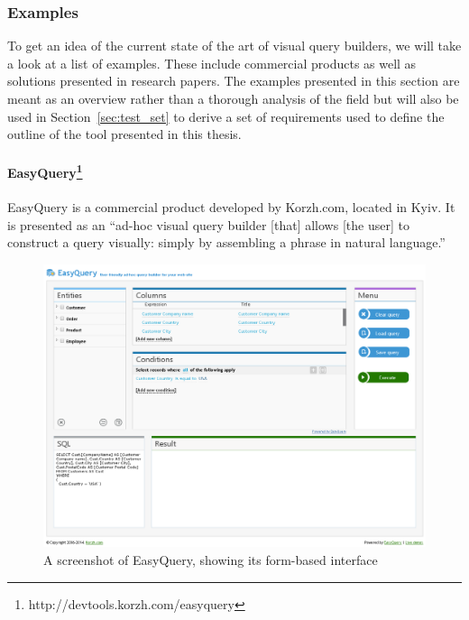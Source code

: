 \documentclass[11pt,a4paper]{globis-book}
\begin{document}
\subsubsection*{Examples}
To get an idea of the current state of the art of visual query builders, we will take a look at a list of examples. These include commercial products as well as solutions presented in research papers. The examples presented in this section are meant as an overview rather than a thorough analysis of the field but will also be used in Section~\ref{sec:test_set} to derive a set of requirements used to define the outline of the tool presented in this thesis.

\paragraph*{EasyQuery\footnote{http://devtools.korzh.com/easyquery}}
EasyQuery is a commercial product developed by Korzh.com, located in Kyiv. It is presented as an ``ad-hoc visual query builder [that] allows [the user] to construct a query visually: simply by assembling a phrase in natural language.''

\begin{figure}[h]
  \centering
  \includegraphics[width=\textwidth]{resources/EasyQuery.png}
  \caption{A screenshot of EasyQuery, showing its form-based interface}
  \label{fig:easyquery}
\end{figure}
\end{document}
